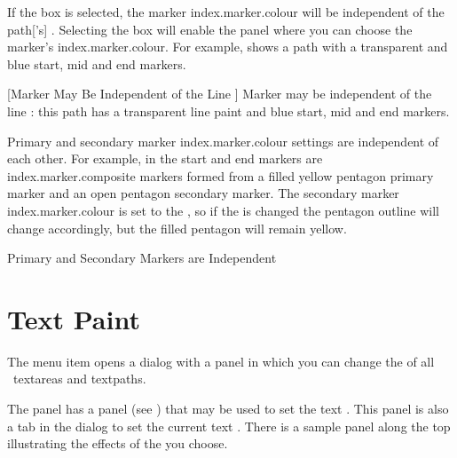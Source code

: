 
If the  box is selected, the marker
\gls{index.marker.colour} will be independent of the \gls*{path}['s]
. Selecting the  box 
will enable the  panel where you can choose
the marker's \gls{index.marker.colour}.
For example,  shows a \gls*{path} with
a \gls{transparent}  and blue start, mid and end
markers.

{}
[Marker  May Be Independent of the Line
]
{Marker  may be independent of the line
:
this path has a transparent line paint and blue
start, mid and end markers.}

Primary and secondary marker \gls{index.marker.colour} settings are
independent of each other.  For example, in
 the start and end markers are
\gls{index.marker.composite} markers formed from a filled yellow
pentagon primary marker and an open pentagon secondary marker. The
secondary marker \gls{index.marker.colour} is set to the
, so if the  is changed
the pentagon outline will change accordingly, but the filled
pentagon will remain yellow.

{}
{Primary and Secondary Markers are Independent}

\section{Text Paint}\label{sec:textpaint}


The  menu item opens a dialog
with a  panel in which
you can change the  
of all \selected\ \glspl{textarea} and \glspl{textpath}.


The  panel has a  panel
(see ) that may be used to set the 
text . This panel is also a tab
in the  dialog to set the current
text .
There is a sample panel along the top illustrating the effects of
the  you choose.

